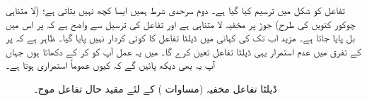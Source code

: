 تفاعل  کو شکل  میں ترسیم کیا گیا ہے۔ دوم سرحدی شرط ہمیں ایسا کچھ نہیں بتاتی ہے؛ (لا متناہی چوکور کنویں کی طرح) جوڑ پر مخفیہ لا متناہی ہے اور تفاعل کی ترسیل سے واضح ہے کہ  پر اس میں بل پایا جاتا ہے۔ مزید اب تک کی کہانی میں ڈیلٹا تفاعل کا کوئی کردار نہیں پایا گیا۔ ظاہر ہے کہ  پر  کے تفرق میں عدم استمرار یہی ڈیلٹا تفاعل تعین کرے گا۔ میں یہ عمل آپ کو کر کے دکھاتا ہوں جہاں آپ یہ بھی دیکھ پائیں گے کہ کیوں  عموماً استمراری ہوتا ہے۔ 

\begin{figure}
\centering
{}
\caption{ڈیلٹا تفاعل مخفیہ (مساوات ) کے لئے مقید حال تفاعل موج۔}
\label{شکل_غیر_تابع_مقید_حال_تفاعل_موج}
\end{figure}

